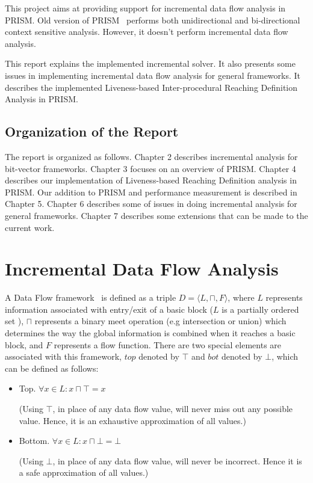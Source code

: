 \documentclass[11pt,a4paper,openright]{report}
\begin{document}
This project aims at providing support for incremental data flow analysis in PRISM.
Old version of PRISM~\cite{thesis_v} performs both unidirectional and bi-directional context sensitive analysis. 
However, it doesn't perform incremental data flow analysis.

This report explains the implemented incremental solver. It also presents some issues in implementing incremental data flow analysis for general
frameworks. It describes the implemented Liveness-based Inter-procedural Reaching Definition Analysis in PRISM.




\section{Organization of the Report}
The report is organized as follows. Chapter 2 describes incremental analysis for bit-vector frameworks.
Chapter 3 focuses on an overview of PRISM. Chapter 4 describes our implementation of Liveness-based Reaching Definition analysis in 
PRISM. Our addition to PRISM and performance measurement is described in Chapter 5.
Chapter 6 describes some of issues in doing incremental analysis for general frameworks. Chapter 7 describes some extensions
that can be made to the current work. 


\chapter{Incremental Data Flow Analysis}
A Data Flow framework~\cite{thesis_sir} is defined as a triple $D =\langle L,\sqcap,F\rangle$, where $L$ represents information associated 
with entry/exit of a basic block ($L$ is a partially ordered set ), $\sqcap$ represents a binary meet operation (e.g intersection or union) 
which determines the way the global information is combined when it reaches a basic block, and $F$ represents a flow function. 
There are two special elements are associated with this framework, $top$ denoted by $\top$ and $bot$ denoted by $\bot$, 
which can be defined as follows:
\begin{itemize}
\item {Top.}
$\forall x \in L : x \sqcap \top = x $ 

(Using $\top$, in place of any data flow value, will never miss out any possible value. Hence, it is an exhaustive approximation of all values.)

\item {Bottom.}
$\forall x \in L : x \sqcap \bot =\bot $

(Using $\bot$, in place of any data flow value, will never be incorrect. Hence it is a safe approximation of all values.)


\end{itemize}
\end{document}
